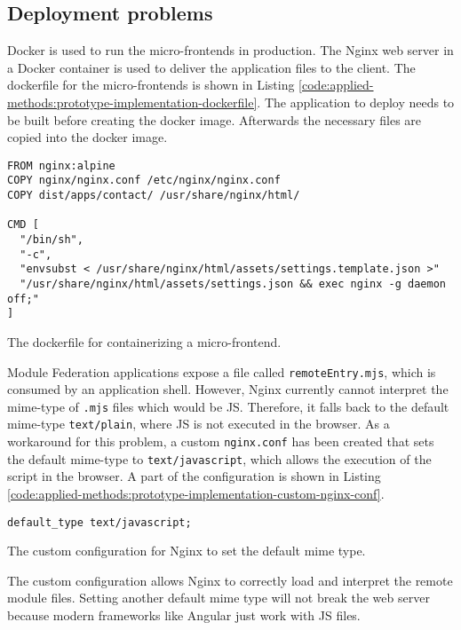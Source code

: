 \subsection{Deployment problems}\label{subsection:applied-methods:prototypical-implementation:nginx-problems}

Docker is used to run the micro-frontends in production. The Nginx web server in a Docker container is used to deliver the application files to the client. The dockerfile for the micro-frontends is shown in Listing \ref{code:applied-methods:prototype-implementation-dockerfile}. The application to deploy needs to be built before creating the docker image. Afterwards the necessary files are copied into the docker image.

\ifshowListings
  \begin{listing}[H]
  \begin{verbatim}
FROM nginx:alpine
COPY nginx/nginx.conf /etc/nginx/nginx.conf
COPY dist/apps/contact/ /usr/share/nginx/html/
    
CMD [
  "/bin/sh", 
  "-c", 
  "envsubst < /usr/share/nginx/html/assets/settings.template.json >" 
  "/usr/share/nginx/html/assets/settings.json && exec nginx -g daemon off;"
]
  \end{verbatim}
  \caption{The dockerfile for containerizing a micro-frontend.}\label{code:applied-methods:prototype-implementation-dockerfile}
  \end{listing}
\fi

\noindent Module Federation applications expose a file called \texttt{remoteEntry.mjs}, which is consumed by an application shell. However, Nginx currently cannot interpret the mime-type of \texttt{\*.mjs} files which would be \ac{JS}. Therefore, it falls back to the default mime-type \texttt{text/plain}, where \ac{JS} is not executed in the browser. As a workaround for this problem, a custom \texttt{nginx.conf} has been created that sets the default mime-type to \texttt{text/javascript}, which allows the execution of the script in the browser. A part of the configuration is shown in Listing \ref{code:applied-methods:prototype-implementation-custom-nginx-conf}.

\ifshowListings
  \begin{listing}[H]
  \begin{verbatim}
default_type text/javascript;
  \end{verbatim}
  \caption{The custom configuration for Nginx to set the default mime type.}\label{code:applied-methods:prototype-implementation-custom-nginx-conf}
  \end{listing}
\fi

\noindent The custom configuration allows Nginx to correctly load and interpret the remote module files. Setting another default mime type will not break the web server because modern frameworks like Angular just work with \ac{JS} files.
